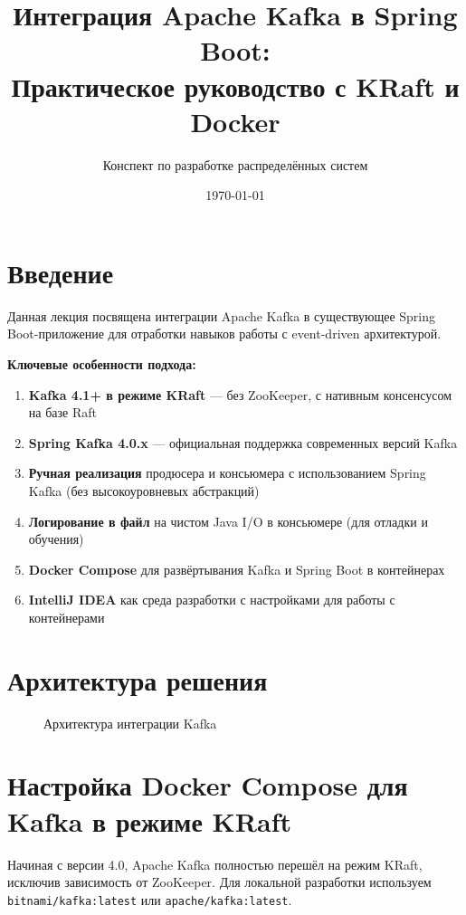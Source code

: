 \documentclass[a4paper,12pt]{article}
\title{Интеграция Apache Kafka в Spring Boot:\\Практическое руководство с KRaft и Docker}
\author{Конспект по разработке распределённых систем}
\date{\today}
\begin{document}
\maketitle
\tableofcontents

\section{Введение}
Данная лекция посвящена интеграции Apache Kafka в существующее Spring Boot-приложение для отработки навыков работы с event-driven архитектурой. 

\textbf{Ключевые особенности подхода:}
\begin{enumerate}
    \item \textbf{Kafka 4.1+ в режиме KRaft} — без ZooKeeper, с нативным консенсусом на базе Raft
    \item \textbf{Spring Kafka 4.0.x} — официальная поддержка современных версий Kafka
    \item \textbf{Ручная реализация} продюсера и консьюмера с использованием Spring Kafka (без высокоуровневых абстракций)
    \item \textbf{Логирование в файл} на чистом Java I/O в консьюмере (для отладки и обучения)
    \item \textbf{Docker Compose} для развёртывания Kafka и Spring Boot в контейнерах
    \item \textbf{IntelliJ IDEA} как среда разработки с настройками для работы с контейнерами
\end{enumerate}

\section{Архитектура решения}
\begin{figure}[h]
\centering
{}
\caption{Архитектура интеграции Kafka}
\end{figure}

\section{Настройка Docker Compose для Kafka в режиме KRaft}
Начиная с версии 4.0, Apache Kafka полностью перешёл на режим KRaft, исключив зависимость от ZooKeeper. Для локальной разработки используем \texttt{bitnami/kafka:latest} или \texttt{apache/kafka:latest}.
\end{document}
